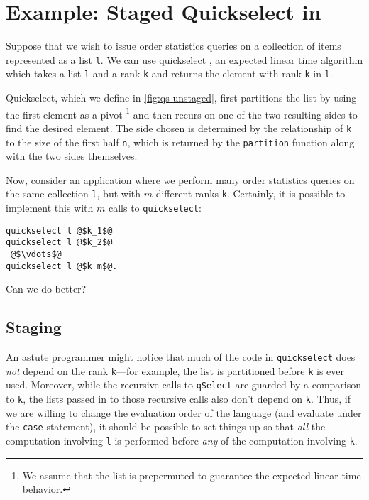 \section {Example: Staged Quickselect in \texorpdfstring{\lang}{λ12}}
\label{sec:staging}




Suppose that we wish to issue order statistics queries on a collection of items
represented as a list \texttt{l}. We can use quickselect \cite{quickselect}, an
expected linear time algorithm which takes a list \texttt{l} and a rank
\texttt{k} and returns the element with rank \texttt{k} in \texttt{l}.

Quickselect, which we define in \ref{fig:qs-unstaged}, first partitions the list
by using the first element as a pivot%
\footnote{We assume that the list is prepermuted to guarantee the expected
linear time behavior.}
and then recurs on one of the two resulting sides to find the desired element.
The side chosen is determined by the relationship of \texttt{k} to the size of
the first half \texttt{n}, which is returned by the \texttt{partition} function
along with the two sides themselves.

Now, consider an application where we perform many order statistics queries on
the same collection \texttt{l}, but with $m$ different ranks \texttt{k}.
Certainly, it is possible to implement this with $m$ calls to
\texttt{quickselect}:
%
\begin{lstlisting}
quickselect l @$k_1$@
quickselect l @$k_2$@
 @$\vdots$@ 
quickselect l @$k_m$@.
\end{lstlisting}
%
Can we do better?

\subsection{Staging}

An astute programmer might notice that much of the code in \texttt{quickselect}
does \emph{not} depend on the rank \texttt{k}---for example, the list is
partitioned before \texttt{k} is ever used. Moreover, while the recursive calls
to \texttt{qSelect} are guarded by a comparison to \texttt{k}, the lists passed
in to those recursive calls also don't depend on \texttt{k}. Thus, if we are
willing to change the evaluation order of the language (and evaluate under the
\texttt{case} statement), it should be possible to set things up so that
\emph{all} the computation involving \texttt{l} is performed before \emph{any}
of the computation involving \texttt{k}.

